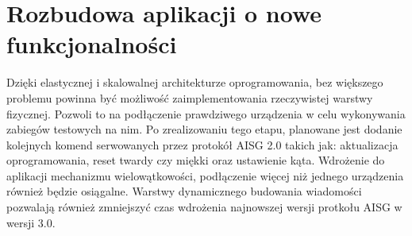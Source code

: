 \section{Rozbudowa aplikacji o nowe funkcjonalności}
    Dzięki elastycznej i skalowalnej architekturze oprogramowania, bez większego problemu powinna być możliwość zaimplementowania rzeczywistej
    warstwy fizycznej. Pozwoli to na podłączenie prawdziwego urządzenia w celu wykonywania zabiegów testowych na nim. Po zrealizowaniu
    tego etapu, planowane jest dodanie kolejnych komend serwowanych przez protokół AISG 2.0 takich jak: aktualizacja oprogramowania, 
    reset twardy czy miękki oraz ustawienie kąta. Wdrożenie do aplikacji mechanizmu wielowątkowości, podłączenie więcej niż jednego urządzenia również będzie osiągalne.
    Warstwy dynamicznego budowania wiadomości pozwalają również zmniejszyć czas wdrożenia najnowszej wersji protkołu AISG w wersji 3.0.
